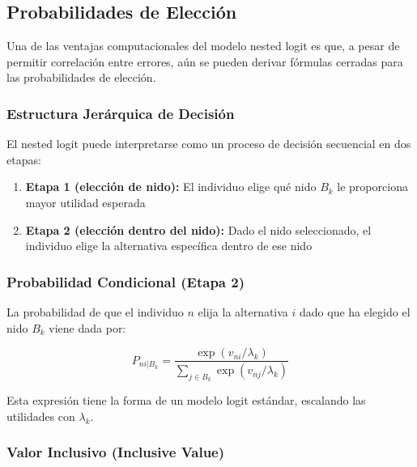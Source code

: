 \documentclass[
]{book}
\providecommand{\tightlist}{%
  \setlength{\itemsep}{0pt}\setlength{\parskip}{0pt}}
\begin{document}
\hypertarget{probabilidades-de-elecciuxf3n}{%
\subsection{Probabilidades de Elección}\label{probabilidades-de-elecciuxf3n}}

Una de las ventajas computacionales del modelo nested logit es que, a pesar de permitir correlación entre errores, aún se pueden derivar fórmulas cerradas para las probabilidades de elección.

\hypertarget{estructura-jeruxe1rquica-de-decisiuxf3n}{%
\subsubsection{Estructura Jerárquica de Decisión}\label{estructura-jeruxe1rquica-de-decisiuxf3n}}

El nested logit puede interpretarse como un proceso de decisión secuencial en dos etapas:

\begin{enumerate}
\def\labelenumi{\arabic{enumi}.}
\tightlist
\item
  \textbf{Etapa 1 (elección de nido):} El individuo elige qué nido \(B_k\) le proporciona mayor utilidad esperada
\item
  \textbf{Etapa 2 (elección dentro del nido):} Dado el nido seleccionado, el individuo elige la alternativa específica dentro de ese nido
\end{enumerate}

\hypertarget{probabilidad-condicional-etapa-2}{%
\subsubsection{Probabilidad Condicional (Etapa 2)}\label{probabilidad-condicional-etapa-2}}

La probabilidad de que el individuo \(n\) elija la alternativa \(i\) dado que ha elegido el nido \(B_k\) viene dada por:

\begin{equation}
P_{ni|B_k} = \frac{\exp(v_{ni}/\lambda_k)}{\sum_{j \in B_k} \exp(v_{nj}/\lambda_k)}
\label{eq:condprob}
\end{equation}

Esta expresión tiene la forma de un modelo logit estándar, escalando las utilidades con \(\lambda_k\).

\hypertarget{valor-inclusivo-inclusive-value}{%
\subsubsection{Valor Inclusivo (Inclusive Value)}\label{valor-inclusivo-inclusive-value}}
\end{document}
